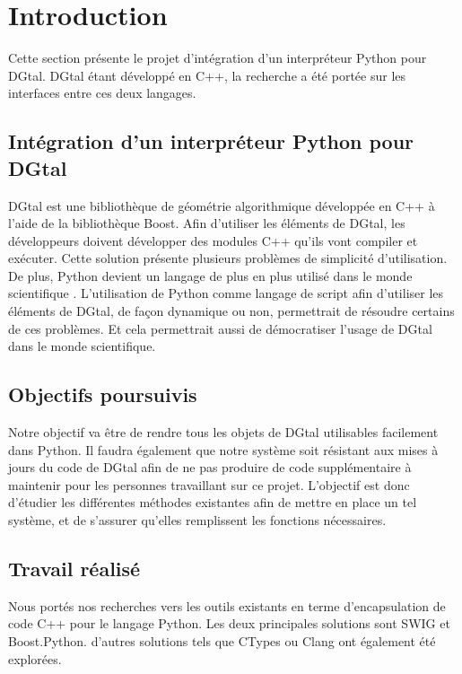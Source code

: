 \documentclass[11pt, french, screen]{report-rd-info}
\begin{document}

\chapter{Introduction}

Cette section présente le projet d'intégration d'un interpréteur Python pour DGtal. DGtal étant développé en C++, la recherche a été portée sur les interfaces entre ces deux langages.

\section{Intégration d'un interpréteur Python pour DGtal}

DGtal est une bibliothèque de géométrie algorithmique développée en C++ à l'aide de la bibliothèque Boost. Afin d'utiliser les éléments de DGtal, les développeurs doivent développer des modules C++ qu'ils vont compiler et exécuter. Cette solution présente plusieurs problèmes de simplicité d'utilisation. De plus, Python devient un langage de plus en plus utilisé dans le monde scientifique \cite{2007PSFCSHans}. L'utilisation de Python comme langage de script afin d'utiliser les éléments de DGtal, de façon dynamique ou non, permettrait de résoudre certains de ces problèmes. Et cela permettrait aussi de démocratiser l'usage de DGtal dans le monde scientifique.

\section{Objectifs poursuivis}

Notre objectif va être de rendre tous les objets de DGtal utilisables facilement dans Python. Il faudra également que notre système soit résistant aux mises à jours du code de DGtal afin de ne pas produire de code supplémentaire à maintenir pour les personnes travaillant sur ce projet.
L'objectif est donc d'étudier les différentes méthodes existantes afin de mettre en place un tel système, et de s'assurer qu'elles remplissent les fonctions nécessaires.

\section{Travail réalisé}

Nous portés nos recherches vers les outils existants en terme d'encapsulation de code C++ pour le langage Python. Les deux principales solutions sont SWIG et Boost.Python. d'autres solutions tels que CTypes ou Clang ont également été explorées.
\end{document}
